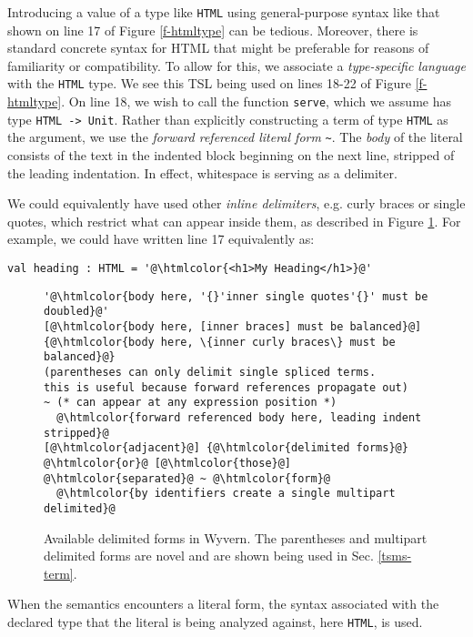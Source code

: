 \documentclass{sig-alternate}[10pt]
\newcommand{\lstinlinew}[1]{\lstinline[style=wyvern]{#1}}
\newcommand{\htmlcolor}[1]{\textcolor[HTML]{339933}{#1}}
\newcommand{\mycaption}[1]{\vspace{-10px}\caption{#1}\vspace{-10px}}
\begin{document}
Introducing a value of a type like \lstinlinew{HTML} using general-purpose syntax like that shown on line 17 of Figure \ref{f-htmltype} can be tedious. Moreover, there is standard concrete syntax for HTML that might be preferable for reasons of familiarity or compatibility. To allow for this, we associate a \emph{type-specific language} with the \lstinlinew{HTML} type. %
We see this TSL being used on lines 18-22 of Figure \ref{f-htmltype}. On line 18, we wish to call the function \lstinlinew{serve}, which we assume has type \lstinlinew{HTML -> Unit}. Rather than explicitly constructing a term of type \lstinlinew{HTML} as the argument, we use the \emph{forward referenced literal form} \lstinline[style=wyvern]{~}. The \emph{body} of the literal consists of the text in the indented block beginning on the next line, stripped of the leading indentation. In effect, whitespace is serving as a delimiter. 

We could equivalently have used other \emph{inline delimiters}, e.g. curly braces or single quotes, which restrict what can appear inside them, as described in Figure \ref{f-delimited}. For example, we could have written line 17 equivalently as:
\vspace{-3px}\begin{lstlisting}[style=wyvern, numbers=none, frame=none]
  val heading : HTML = '@\htmlcolor{<h1>My Heading</h1>}@'
\end{lstlisting}\vspace{-4px}

\begin{figure}[t]
\begin{lstlisting}[style=tempwyvern]
'@\htmlcolor{body here, '{}'inner single quotes'{}' must be doubled}@'
[@\htmlcolor{body here, [inner braces] must be balanced}@]
{@\htmlcolor{body here, \{inner curly braces\} must be balanced}@}
(parentheses can only delimit single spliced terms. 
this is useful because forward references propagate out)
~ (* can appear at any expression position *)
  @\htmlcolor{forward referenced body here, leading indent stripped}@
[@\htmlcolor{adjacent}@] {@\htmlcolor{delimited forms}@} @\htmlcolor{or}@ [@\htmlcolor{those}@] @\htmlcolor{separated}@ ~ @\htmlcolor{form}@
  @\htmlcolor{by identifiers create a single multipart delimited}@
\end{lstlisting}
\mycaption{Available delimited forms in Wyvern. The parentheses and multipart delimited forms are novel and are shown being used in Sec. \ref{tsms-term}. }
\label{f-delimited}
\end{figure}
When the semantics encounters a literal form, the syntax associated with the declared type that the literal is being analyzed against, here \lstinlinew{HTML}, is used. 
\end{document}

